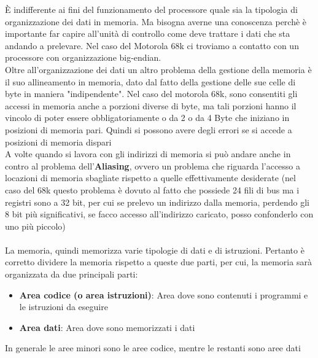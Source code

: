 \MakeUppercase{è} indifferente ai fini del funzionamento del processore quale sia la tipologia di organizzazione dei dati in memoria. Ma bisogna averne una conoscenza perchè è importante far capire all'unità di controllo come deve trattare i dati che sta andando a prelevare. Nel caso del Motorola 68k ci troviamo a contatto con un processore con organizzazione big-endian.
\\
Oltre all'organizzazione dei dati un altro problema della gestione della memoria è il suo allineamento in memoria, dato dal fatto della gestione delle sue celle di byte in maniera "indipendente".
Nel caso del motorola 68k, sono consentiti gli accessi in memoria anche a porzioni diverse di byte, ma tali porzioni hanno il vincolo di poter essere obbligatoriamente o da 2 o da 4 Byte che iniziano in posizioni di memoria pari. Quindi si possono avere degli errori se si accede a posizioni di memoria dispari
\\
A volte quando si lavora con gli indirizzi di memoria si può andare anche in contro al problema dell'\textbf{Aliasing}, ovvero un problema che riguarda l'accesso a locazioni di memoria sbagliate rispetto a quelle effettivamente desiderate (nel caso del 68k questo problema è dovuto al fatto che possiede 24 fili di bus ma i registri sono a 32 bit, per cui se prelevo un indirizzo dalla memoria, perdendo gli 8 bit più significativi, se facco accesso all'indirizzo caricato, posso confonderlo con uno più piccolo)
\\
\\
La memoria, quindi memorizza varie tipologie di dati e di istruzioni. Pertanto è corretto dividere la memoria rispetto a queste due parti, per cui, la memoria sarà organizzata da due principali parti:
\begin{itemize}
    \item \textbf{Area codice (o area istruzioni)}: Area dove sono contenuti i programmi e le istruzioni da eseguire
    \item \textbf{Area dati}: Area dove sono memorizzati i dati
\end{itemize}

In generale le aree minori sono le aree codice, mentre le restanti sono aree dati

